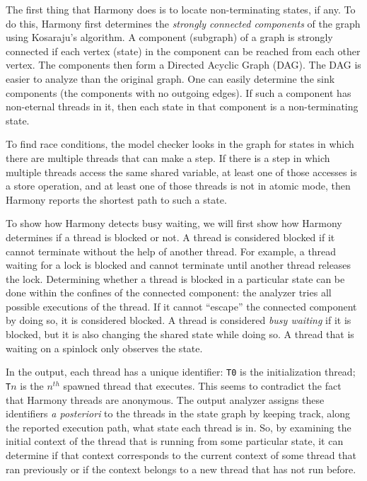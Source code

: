 \documentclass{report}
\begin{document}
The first thing that Harmony does is to locate non-terminating
states, if any.  To do this, Harmony first determines the \emph{strongly
connected components} of the graph using Kosaraju's algorithm.
A component (subgraph) of a graph is strongly connected if each
vertex (state) in the component can be reached from each other vertex.
The components then form a Directed Acyclic Graph (DAG).
The DAG is easier to analyze than the original graph.
One can easily determine the sink components
(the components with no outgoing edges).  If such a component
has non-eternal threads in it, then each state in that component
is a non-terminating state.

To find race conditions, the model checker looks in the graph for
states in which there are multiple threads that can make a step.
If there is a step in which multiple threads access the same shared
variable, at least one of those accesses is a store operation, and
at least one of those threads is not in atomic mode, then Harmony
reports the shortest path to such a state.

To show how Harmony detects busy waiting, we will first show how
Harmony determines if a thread is blocked or not.  A thread is considered
blocked if it cannot terminate without the help of another thread.
For example, a thread waiting for a lock is blocked and cannot terminate
until another thread releases the lock.  Determining whether a thread
is blocked in a particular state can be done within the confines of the
connected component: the analyzer tries all possible executions of the
thread.  If it cannot ``escape'' the connected component by doing so, it
is considered blocked.
A thread is considered \emph{busy waiting} if it is blocked, but it is
also changing the shared state while doing so.  A thread that is waiting
on a spinlock only observes the state.

In the output, each thread has a unique identifier:
\texttt{T0} is the initialization thread; \texttt{T}$n$ is the $n^{th}$
spawned thread that executes.  This seems to contradict the fact that
Harmony threads are anonymous.  The output analyzer assigns these
identifiers \emph{a posteriori} to the threads in the state graph
by keeping track, along the reported execution path, what state each
thread is in.  So, by examining the initial context of the thread that
is running from some particular state, it can determine if that context
corresponds to the current context of some thread that ran previously
or if the context belongs to a new thread that has not run before.
\end{document}

